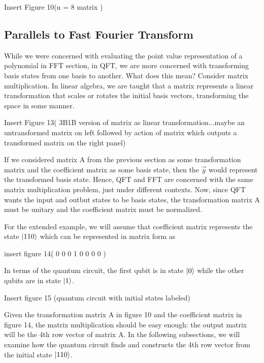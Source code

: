 \documentclass{article}
\begin{document}
    Insert Figure 10(n = 8 matrix )
    \subsection{Parallels to Fast Fourier Transform}
    While we were concerned with evaluating the point value representation of a
    polynomial in FFT section, in QFT, we are more concerned with transforming
    basis states from one basis to another. What does this mean? Consider matrix
    multiplication. In linear algebra, we are taught that a matrix represents
    a linear transformation that scales or rotates the initial basis vectors,
    transforming the space in some manner.

    Insert Figure 13( 3B1B version of matrix as linear transformation...maybe
    an untransformed matrix on left followed by action of matrix which outputs
    a transformed matrix on the right panel)

    If we considered matrix A from the previous section as some transformation
    matrix and the coefficient matrix as some basis state, then the \(\vec{y}\)
    would represent the transformed basis state. Hence, QFT and FFT are concerned
    with the same matrix multiplication problem, just under different contexts.
    Now, since QFT wants the input
    and outbut states to be basis states, the transformation matrix A must be
    unitary and the coefficient matrix must be normalized.

    For the extended example, we will assume that coefficient matrix represents
    the state \(\ket{110}\) which can be represented in matrix form as

    insert figure 14( 0 0 0 1 0 0 0 0 )

    In terms of the quantum circuit, the first qubit is in state \(\ket{0}\)
    while the other qubits are in state \(\ket{1}\).

    Insert figure 15 (quantum circuit with initial states labeled)

    Given the transformation matrix A in figure 10 and the coefficient matrix
    in figure 14, the matrix multiplication should be easy enough: the output
    matrix will be the 4th row vector of matrix A. In the following subsections,
    we will examine how the quantum circuit finds and constructs the 4th row
    vector from the initial state \(\ket{110}\).
\end{document}
